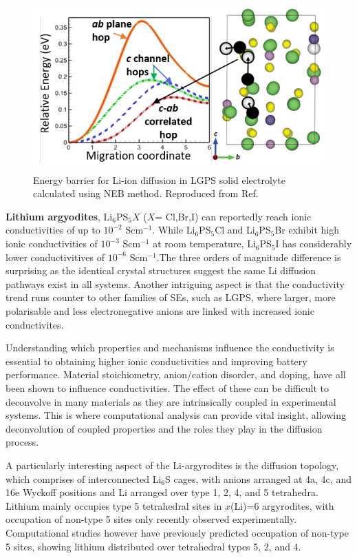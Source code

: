 \documentclass[../main.tex]{subfiles}
\begin{document}
\begin{figure}
    \centering
    \includegraphics[scale=1.2]{figures/lgps.png}
    \caption{Energy barrier for Li-ion diffusion in LGPS solid electrolyte calculated using NEB method. Reproduced from Ref. }
    \label{fig:lgps}
\end{figure}

\textbf{Lithium argyodites}, Li$_6$PS$_{5}X$ ($X$= Cl,Br,I) can reportedly reach ionic conductivities of up to $10^{-2}$ Scm$^{-1}$. \cite{deiseroth_li6ps5x_2008} While Li$_6$PS$_{5}$Cl and Li$_6$PS$_{5}$Br exhibit high ionic conductivities of $10^{-3}$ Scm$^{-1}$ at room temperature, Li$_6$PS$_{5}$I has considerably lower conductivitives of $10^{-6}$ Scm$^{-1}$.The three orders of magnitude difference is surprising as the identical crystal structures suggest the same Li diffusion pathways exist in all systems. Another intriguing aspect is that the conductivity trend runs counter to other families of SEs, such as LGPS, where larger, more polarisable and less electronegative anions are linked with increased ionic conductivites. \cite{bachman2016inorganic}

Understanding which properties and mechanisms influence the conductivity is essential to obtaining higher ionic conductivities and improving battery performance. Material stoichiometry, anion/cation disorder, and doping, have all been shown to influence conductivities. The effect of these can be difficult to deconvolve in many materials as they are intrinsically coupled in experimental systems. This is where computational analysis can provide vital insight, allowing deconvolution of coupled properties and the roles they play in the diffusion process.

A particularly interesting aspect of the Li-argyrodites is the diffusion topology, which comprises of interconnected Li$_6$S cages, with anions arranged at 4a, 4c, and 16e Wyckoff positions and Li arranged over type 1, 2, 4, and 5 tetrahedra.\cite{kuhs1979} Lithium mainly occupies type 5 tetrahedral sites in $x$(Li)=6 argyrodites, with occupation of non-type 5 sites only recently observed experimentally. \cite{ohno2019further,gautamengineering} Computational studies however have previously predicted occupation of non-type 5 sites, showing lithium distributed over tetrahedral types 5, 2, and 4. \cite{deiseroth_li6ps5x_2008, Minafra2020, morgan2020mechanistic}
\end{document}
